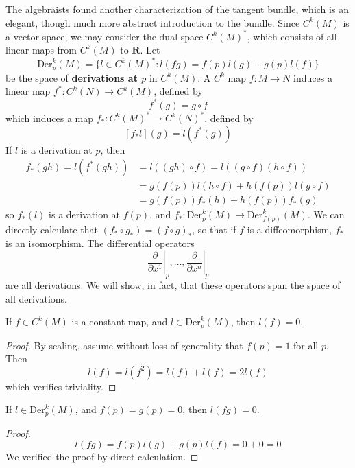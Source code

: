 The algebraists found another characterization of the tangent bundle, which is an elegant, though much more abstract introduction to the bundle. Since $C^k(M)$ is a vector space, we may consider the dual space $C^k(M)^*$, which consists of all linear maps from $C^k(M)$ to $\mathbf{R}$. Let
%
\[ \text{Der}^k_p(M) = \{ l \in C^k(M)^* : l(fg) = f(p) l(g) + g(p) l(f) \} \]
%
be the space of {\bf derivations at $p$} in $C^k(M)$. A $C^k$ map $f: M \to N$ induces a linear map $f^*: C^k(N) \to C^k(M)$, defined by
%
\[ f^*(g) = g \circ f \]
%
which induces a map $f_*: C^k(M)^* \to C^k(N)^*$, defined by
%
\[ [f_*l](g) = l(f^*(g)) \]
%
If $l$ is a derivation at $p$, then
%
\begin{align*}
    f_*(gh) = l(f^*(gh)) &= l((gh) \circ f) = l((g \circ f)(h \circ f))\\
    &= g(f(p)) l(h \circ f) + h(f(p)) l(g \circ f)\\
    &= g(f(p)) f_*(h) + h(f(p)) f_*(g)
\end{align*}
%
so $f_*(l)$ is a derivation at $f(p)$, and $f_*: \text{Der}^k_p(M) \to \text{Der}^k_{f(p)}(M)$. We can directly calculate that $(f_* \circ g_*) = (f \circ g)_*$, so that if $f$ is a diffeomorphism, $f_*$ is an isomorphism. The differential operators
%
\[ \left. \frac{\partial}{\partial x^1} \right|_p, \dots, \left. \frac{\partial}{\partial x^n}\right|_p \]
%
are all derivations. We will show, in fact, that these operators span the space of all derivations.

\begin{lemma}
    If $f \in C^k(M)$ is a constant map, and $l \in \text{Der}^k_p(M)$, then $l(f) = 0$.
\end{lemma}
\begin{proof}
    By scaling, assume without loss of generality that $f(p) = 1$ for all $p$. Then
    \[ l(f) = l(f^2) = l(f) + l(f) = 2 l(f) \]
    which verifies triviality.
\end{proof}

\begin{lemma}
    If $l \in \text{Der}_p^k(M)$, and $f(p) = g(p) = 0$, then $l(fg) = 0$.
\end{lemma}
\begin{proof}
    \[ l(fg) = f(p) l(g) + g(p) l(f) = 0 + 0 = 0 \]
    We verified the proof by direct calculation.
\end{proof}

